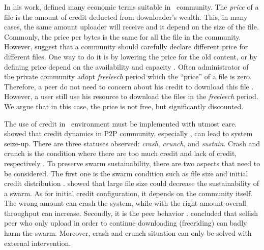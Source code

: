 In his work, \citeauthor{2012:economicbt:kash} defined many economic terms suitable in \bt~community. The \textit{price} of a file is the amount of credit deducted from downloader's wealth. This, in many cases, the same amount uploader will receive and it depend on the size of the file. Commonly, the price per bytes is the same for all the file in the community. However, \citeauthor{2012:economicbt:kash} suggest that a community should carefully declare different price for different files. One way to do it is by lowering the price for the old content, or by defining price depend on the availability and capacity \cite{2012:economicbt:kash}. Often administrator of the private community adopt \textit{freeleech} period which the ``price'' of a file is zero. Therefore, a peer do not need to concern about his credit to download this file \cite{2010:crashsustain:rahman}. However, a user still use his resource to download the files in the \textit{freeleech} period. We argue that in this case, the price is not free, but significantly discounted.

The use of credit in \bt~environment must be implemented with utmost care. \citeauthor{2010:crashsustain:rahman} showed that credit dynamics in P2P community, especially \bt, can lead to system seize-up. There are three statuses observed: \textit{crash}, \textit{crunch}, and \textit{sustain}. Crash and crunch is the condition where there are too much credit and lack of credit, respectively \cite{2010:crashsustain:rahman, 2015:sustainabilitypt:vinko}. To preserve swarm sustainability, there are two aspects that need to be considered. The first one is the swarm condition such as file size and initial credit distribution \cite{2015:sustainabilitypt:vinko}. \citeauthor{2015:sustainabilitypt:vinko} showed that large file size could decrease the sustainability of a swarm. As for initial credit configuration, it depends on the community itself. The wrong amount can crash the system, while with the right amount overall throughput can increase. Secondly, it is the peer behavior \cite{2010:crashsustain:rahman}. \citeauthor{2010:crashsustain:rahman} concluded that selfish peer who only upload in order to continue downloading (freeriding) can badly harm the swarm. Moreover, crash and crunch situation can only be solved with external intervention.

